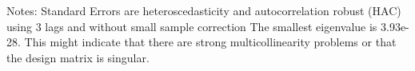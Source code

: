 Notes: \newline
 [1] Standard Errors are heteroscedasticity and autocorrelation robust (HAC) using 3 lags and without small sample correction \newline
 [2] The smallest eigenvalue is 3.93e-28. This might indicate that there are \newline
 strong multicollinearity problems or that the design matrix is singular.